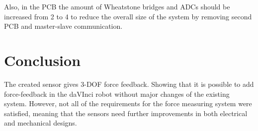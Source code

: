 	Also, in the PCB the amount of Wheatstone bridges and ADCs should be increased from 2 to 4 to reduce the overall size of the system by removing second PCB and master-slave communication.
	
\section{Conclusion}

The created sensor gives 3-DOF force feedback. Showing that it is possible to add force-feedback in the daVInci robot without major changes of the existing system. However, not all of the requirements for the force measuring system were satisfied, meaning that the sensors need further improvements in both electrical and mechanical designs.